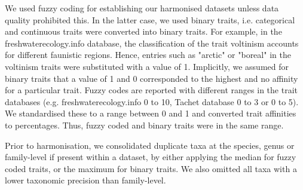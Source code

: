 \documentclass{article}
\begin{document}
We used fuzzy coding for establishing our harmonised datasets unless data quality prohibited this. In the latter case, we used binary traits, i.e. categorical and continuous traits were converted into binary traits. For example, in the  freshwaterecology.info database, the classification of the trait voltinism accounts for different faunistic regions. Hence, entries such as "arctic" or "boreal" in the voltinism traits were substituted with a value of 1. Implicitly, we assumed for binary traits that a value of 1 and 0 corresponded to the highest and no affinity for a particular trait. Fuzzy codes are reported with different ranges in the trait databases (e.g. freshwaterecology.info 0 to 10, Tachet database 0 to 3 or 0 to 5). We standardised these to a range between 0 and 1 and converted trait affinities to percentages. Thus, fuzzy coded and binary traits were in the same range. 

Prior to harmonisation, we consolidated duplicate taxa at the species, genus or family-level if present within a dataset, by either applying the median for fuzzy coded traits, or the maximum for binary traits. We also omitted all taxa with a lower taxonomic precision than family-level.
\end{document}
